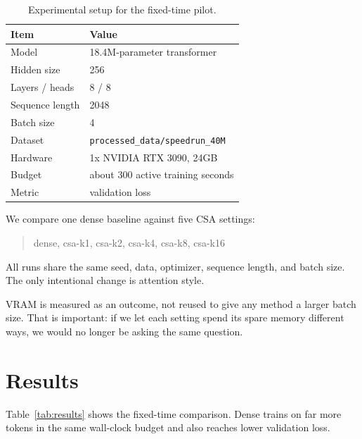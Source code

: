 \documentclass[10pt,twocolumn]{article}
\begin{document}
\begin{table}[t]
\centering
\small
\caption{Experimental setup for the fixed-time pilot.}
\label{tab:setup}
\begin{tabular}{@{}ll@{}}
\toprule
Item & Value \\
\midrule
Model & 18.4M-parameter transformer \\
Hidden size & 256 \\
Layers / heads & 8 / 8 \\
Sequence length & 2048 \\
Batch size & 4 \\
Dataset & \texttt{processed\_data/speedrun\_40M} \\
Hardware & 1x NVIDIA RTX 3090, 24GB \\
Budget & about 300 active training seconds \\
Metric & validation loss \\
\bottomrule
\end{tabular}
\end{table}

We compare one dense baseline against five CSA settings:

\begin{quote}
dense,\; csa-k1,\; csa-k2,\; csa-k4,\; csa-k8,\; csa-k16
\end{quote}

All runs share the same seed, data, optimizer, sequence length, and batch size.
The only intentional change is attention style.

VRAM is measured as an outcome, not reused to give any method a larger batch
size. That is important: if we let each setting spend its spare memory
different ways, we would no longer be asking the same question.

\section{Results}

Table~\ref{tab:results} shows the fixed-time comparison. Dense trains on far
more tokens in the same wall-clock budget and also reaches lower validation
loss.
\end{document}
